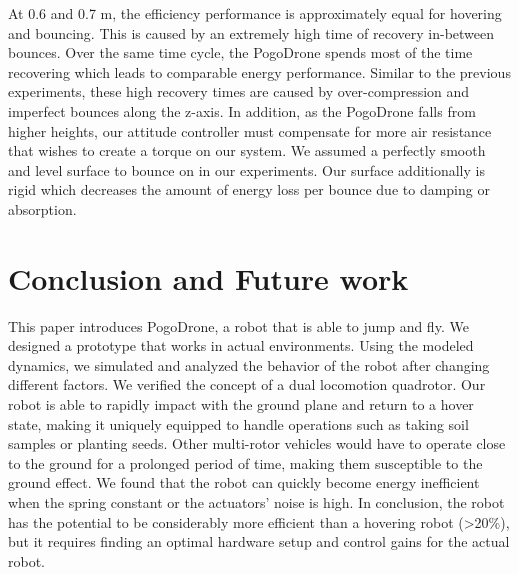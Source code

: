\documentclass[letterpaper,10pt,conference]{ieeeconf}
\begin{document}
%
At 0.6 and 0.7 m, the efficiency performance is approximately equal for hovering and bouncing. This is caused by an extremely high time of recovery in-between bounces. Over the same time cycle, the PogoDrone spends most of the time recovering which leads to comparable energy performance. Similar to the previous experiments, these high recovery times are caused by over-compression and imperfect bounces along the z-axis. In addition, as the PogoDrone falls from higher heights, our attitude controller must compensate for more air resistance that wishes to create a torque on our system. 
%
We assumed a perfectly smooth and level surface to bounce on in our experiments. Our surface additionally is rigid which decreases the amount of energy loss per bounce due to damping or absorption.





\section{Conclusion and Future work}
\label{sec:conclusion}
This paper introduces PogoDrone, a  robot that
is able to jump and fly.
We designed a prototype that works in actual environments. 
Using the modeled dynamics, we simulated and analyzed the behavior of the robot after changing different factors.
{We verified the concept of a dual locomotion quadrotor. Our robot is able to rapidly impact with the ground plane and return to a hover state, making it uniquely equipped to handle operations such as taking soil samples or planting seeds. Other multi-rotor vehicles would have to operate close to the ground for a prolonged period of time, making them susceptible to the ground effect.
}
We found that the robot can quickly become energy inefficient
when the spring constant or the actuators' noise is high. 
In conclusion, the robot has the potential to be considerably more efficient than a hovering robot (>20\%), but it requires finding an optimal hardware setup and control gains for the actual robot.
\end{document}
